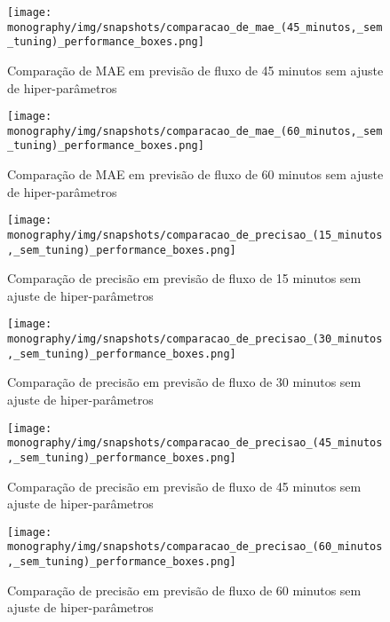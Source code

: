 \begin{figure}[htbp]
    \centering
    \texttt{[image: monography/img/snapshots/comparacao\_de\_mae\_(45\_minutos,\_sem\_tuning)\_performance\_boxes.png]}
    \label{figure:comparacao_previsao_mae_45_sem_tuning}
    \caption{Comparação de MAE em previsão de fluxo de 45 minutos sem ajuste de hiper-parâmetros}
\end{figure}

\begin{figure}[htbp]
    \centering
    \texttt{[image: monography/img/snapshots/comparacao\_de\_mae\_(60\_minutos,\_sem\_tuning)\_performance\_boxes.png]}
    \label{figure:comparacao_previsao_mae_60_sem_tuning}
    \caption{Comparação de MAE em previsão de fluxo de 60 minutos sem ajuste de hiper-parâmetros}
\end{figure}

\begin{figure}[htbp]
    \centering
    \texttt{[image: monography/img/snapshots/comparacao\_de\_precisao\_(15\_minutos,\_sem\_tuning)\_performance\_boxes.png]}
    \label{figure:comparacao_previsao_precisao_15_sem_tuning}
    \caption{Comparação de precisão em previsão de fluxo de 15 minutos sem ajuste de hiper-parâmetros}
\end{figure}

\begin{figure}[htbp]
    \centering
    \texttt{[image: monography/img/snapshots/comparacao\_de\_precisao\_(30\_minutos,\_sem\_tuning)\_performance\_boxes.png]}
    \label{figure:comparacao_previsao_precisao_30_sem_tuning}
    \caption{Comparação de precisão em previsão de fluxo de 30 minutos sem ajuste de hiper-parâmetros}
\end{figure}

\begin{figure}[htbp]
    \centering
    \texttt{[image: monography/img/snapshots/comparacao\_de\_precisao\_(45\_minutos,\_sem\_tuning)\_performance\_boxes.png]}
    \label{figure:comparacao_previsao_precisao_45_sem_tuning}
    \caption{Comparação de precisão em previsão de fluxo de 45 minutos sem ajuste de hiper-parâmetros}
\end{figure}

\begin{figure}[htbp]
    \centering
    \texttt{[image: monography/img/snapshots/comparacao\_de\_precisao\_(60\_minutos,\_sem\_tuning)\_performance\_boxes.png]}
    \label{figure:comparacao_previsao_precisao_60_sem_tuning}
    \caption{Comparação de precisão em previsão de fluxo de 60 minutos sem ajuste de hiper-parâmetros}
\end{figure}

